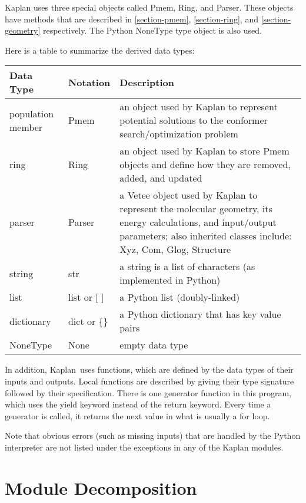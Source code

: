 \documentclass[12pt, titlepage]{article}
\newcommand{\progname}{Kaplan}
\begin{document}
\progname{} uses three special objects called Pmem, Ring, and Parser. These 
objects have methods that are described in \ref{section-pmem}, 
\ref{section-ring}, and \ref{section-geometry} respectively. The Python 
NoneType type object is also used.

Here is a table to summarize the derived data types:

\begin{center}
\renewcommand{\arraystretch}{1.2}
\noindent 
\begin{tabular}{l l p{7.5cm}} 
\toprule 
\textbf{Data Type} & \textbf{Notation} & \textbf{Description}\\ 
\midrule
population member & Pmem & an object used by \progname{} to represent potential 
solutions to the conformer search/optimization problem \\
ring & Ring & an object used by \progname{} to store Pmem objects and define 
how they are removed, added, and updated \\
parser & Parser & a Vetee object used by \progname{} to represent the molecular 
geometry, its energy calculations, and input/output parameters; also inherited 
classes include: Xyz, Com, Glog, Structure \\
string & str & a string is a list of characters (as implemented in Python) \\
list & list or [ ] & a Python list (doubly-linked) \\
dictionary & dict or \{\} & a Python dictionary that has key value pairs \\
NoneType & None & empty data type \\
\bottomrule
\end{tabular} 
\end{center}

In addition, \progname \ uses functions, which
are defined by the data types of their inputs and outputs. Local functions are
described by giving their type signature followed by their specification. There 
is one generator function in this program, which uses the yield keyword instead 
of the return keyword. Every time a generator is called, it returns the next 
value in what is usually a for loop.

Note that obvious errors (such as missing inputs) that are handled by the 
Python interpreter are not listed under the exceptions in any of the 
\progname{} modules. 

\section{Module Decomposition}
\end{document}
